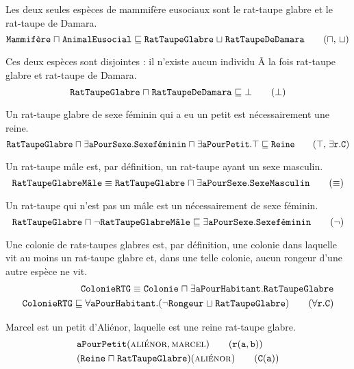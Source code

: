\documentclass[11pt, a4paper]{article}
\def\fm#1{\text{\texttt{#1}}}
\def\roleR{\fm{r}}
\def\instanceA{\fm{a}}
\def\instanceB{\fm{b}}
\def\conceptC{\fm{C}}
\def\subsumepar{\sqsubseteq}
\def\ET{\mathrel{\sqcap}}
\def\OU{\mathrel{\sqcup}}
\begin{document}
	Les deux seules espèces de mammifère eusociaux sont le rat-taupe glabre et
	le rat-taupe de Damara.
	\begin{equation*}
	\Mammifere \ET \AnimalEusocial
	\subsumepar
	\RTG \OU \RTD
	\tag{$\ET$, $\OU$}
	\end{equation*}
	
	Ces deux espèces sont disjointes : il n'existe aucun individu Ã  la fois
	rat-taupe glabre et rat-taupe de Damara.
	\begin{equation*}
	\RTG \ET \RTD \subsumepar \bot
	\tag{$\bot$}
	\end{equation*}
	
	Un rat-taupe glabre de sexe féminin qui a eu un petit est nécessairement une reine.
	\begin{equation*}
	\RTG \ET \exists\aPourSexe.\Sexefeminin \ET \exists\aPourPetit.\top
	\subsumepar
	\Reine
	\tag{$\top$, $\exists\roleR.\conceptC$}
	\end{equation*}
	
	Un rat-taupe mâle est, par définition, un rat-taupe ayant un sexe masculin.
	\begin{equation*}
	\RTGMale
	\equiv
	\RTG \ET \exists\aPourSexe.\SexeMasculin
	\tag{$\equiv$}
	\end{equation*}
	
	Un rat-taupe qui n'est pas un mâle est un nécessairement de sexe féminin.
	\begin{equation*}
	\RTG \ET \lnot\RTGMale
	\subsumepar
	\exists\aPourSexe.\Sexefeminin
	\tag{$\lnot$}
	\end{equation*}
	
	Une colonie de rats-taupes glabres est, par définition,
	une colonie dans laquelle vit au moins
	un rat-taupe glabre et, dans une telle colonie,
	aucun rongeur d'une autre espèce ne vit.
	\begin{align*}
	\ColonieRTG \equiv \Colonie \ET \exists\aPourHabitant.\RTG
	\\
	\ColonieRTG \subsumepar \forall \aPourHabitant.(\lnot\Rongeur \OU \RTG)
	\tag{$\forall \roleR . \conceptC$}
	\end{align*}
	
	Marcel est un petit d'Aliénor, laquelle est une reine rat-taupe glabre.
	\begin{align*}
	&\aPourPetit(\alienor, \marcel)
	\tag{$\roleR(\instanceA, \instanceB)$}
	\\
	&(\Reine\ET\RTG)(\alienor)
	\tag{$\conceptC(\instanceA)$}
	\end{align*}
	
\end{document}
